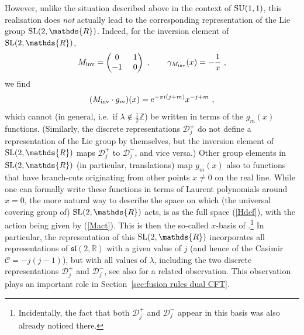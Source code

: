 \documentclass[12pt,a4paper]{article}
\newcommand{\be}{\begin{equation}}
\newcommand{\ee}{\end{equation}}
\begin{document}
However, unlike the situation described above in the context of ${\rm SU}(1,1)$, this realisation does {\it not} actually lead to the corresponding representation of the Lie group ${\rm SL}(2,\mathds{R})$. Indeed, for the inversion element of ${\rm SL}(2,\mathds{R})$, 
\be
M_{\rm inv} = \begin{pmatrix} 0 \ & 1 \cr -1 \ & 0 \end{pmatrix} \ , \qquad \gamma_{M_{\rm inv}}(x) = - \frac{1}{x} \ , 
\ee
we find 
\be
(M_{\rm inv} \cdot g_m )(x)  = \mathrm{e}^{-\pi i(j+m)} x^{-j +m} \ , 
\ee
which cannot (in general, i.e.\ if $\lambda\not\in \frac{1}{2}\mathds{Z}$) be written in terms of the $g_m(x)$ functions. (Similarly, the discrete representations $\mathscr{D}^{\pm}_j$ do not define a representation of the Lie group by themselves, but the inversion element of ${\rm SL}(2,\mathds{R})$ maps $\mathscr{D}^+_j$ to $\mathscr{D}^-_j$, and vice versa.)
%
%
Other group elements in ${\rm SL}(2,\mathds{R})$ (in particular, translations) map $g_m(x)$ also to functions that have branch-cuts originating from other points $x\neq 0$ on the real line.  While one can formally write these functions in terms of Laurent polynomials around $x=0$, the more natural way to describe the space on which (the universal covering group of) ${\rm SL}(2,\mathds{R})$ acts, is as the full space (\ref{Hdef}), with the action being given by (\ref{Mact}). This is then the so-called $x$-basis of \cite{Maldacena:2000hw}.\footnote{Incidentally, the fact that both $\mathscr{D}^+_j$ and $\mathscr{D}^-_j$ appear in this basis was also already noticed there.} In particular, the representation of this ${\rm SL}(2,\mathds{R})$ incorporates all representations of $\mathfrak{sl}(2,\mathds{R})$ with a given value of $j$ (and hence of the Casimir $\mathcal{C}=-j(j-1)$), but with all values of $\lambda$, including the two discrete representations $\mathscr{D}^+_j$ and $\mathscr{D}^-_j$, see also \cite{Ribault:2009ui} for a related observation.
This observation plays an important role in Section~\ref{sec:fusion rules dual CFT}.
\end{document}
